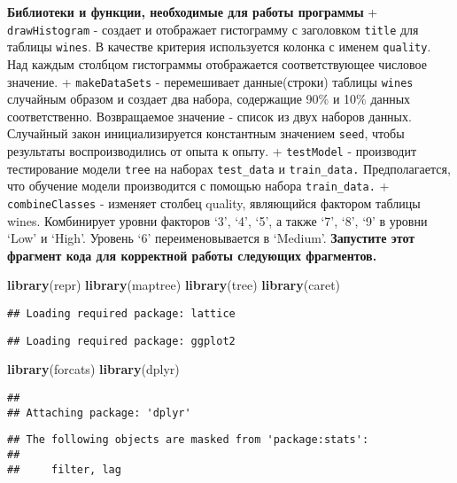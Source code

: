 \documentclass[
]{article}
\newenvironment{Shaded}{\begin{snugshade}}{\end{snugshade}}
\newcommand{\KeywordTok}[1]{\textcolor[rgb]{0.13,0.29,0.53}{\textbf{#1}}}
\newcommand{\NormalTok}[1]{#1}
\begin{document}
\textbf{Библиотеки и функции, необходимые для работы программы} +
\texttt{drawHistogram} - создает и отображает гистограмму с заголовком
\texttt{title} для таблицы \texttt{wines}. В качестве критерия
используется колонка с именем \texttt{quality}. Над каждым столбцом
гистограммы отображается соответствующее числовое значение. +
\texttt{makeDataSets} - перемешивает данные(строки) таблицы
\texttt{wines} случайным образом и создает два набора, содержащие 90\% и
10\% данных соответственно. Возвращаемое значение - список из двух
наборов данных. Случайный закон инициализируется константным значением
\texttt{seed}, чтобы результаты воспроизводились от опыта к опыту. +
\texttt{testModel} - производит тестирование модели \texttt{tree} на
наборах \texttt{test\_data} и \texttt{train\_data.} Предполагается, что
обучение модели производится с помощью набора \texttt{train\_data.} +
\texttt{combineClasses} - изменяет столбец quality, являющийся фактором
таблицы wines. Комбинирует уровни факторов `3', `4', `5', а также `7',
`8', `9' в уровни `Low' и `High'. Уровень `6' переименовывается в
`Medium'. \textbf{Запустите этот фрагмент кода для корректной работы
следующих фрагментов.}

\begin{Shaded}
\begin{Highlighting}[]
\KeywordTok{library}\NormalTok{(repr)}
\KeywordTok{library}\NormalTok{(maptree)}
\KeywordTok{library}\NormalTok{(tree)}
\KeywordTok{library}\NormalTok{(caret)}
\end{Highlighting}
\end{Shaded}

\begin{verbatim}
## Loading required package: lattice
\end{verbatim}

\begin{verbatim}
## Loading required package: ggplot2
\end{verbatim}

\begin{Shaded}
\begin{Highlighting}[]
\KeywordTok{library}\NormalTok{(forcats)}
\KeywordTok{library}\NormalTok{(dplyr)}
\end{Highlighting}
\end{Shaded}

\begin{verbatim}
## 
## Attaching package: 'dplyr'
\end{verbatim}

\begin{verbatim}
## The following objects are masked from 'package:stats':
## 
##     filter, lag
\end{verbatim}
\end{document}
